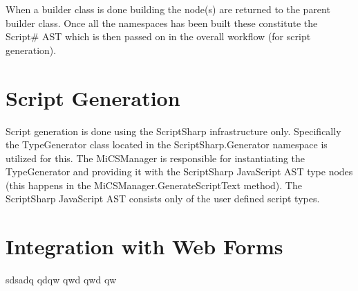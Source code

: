 	When a builder class is done building the node(s) are returned to the parent builder class. Once all the namespaces has been built these constitute the Script\# AST which is then passed on in the overall workflow (for script generation).

\section{Script Generation} %
\label{sec:script_generation}
	Script generation is done using the ScriptSharp infrastructure only. Specifically the TypeGenerator class located in the ScriptSharp.Generator namespace is utilized for this. The MiCSManager is responsible for instantiating the TypeGenerator and providing it with the ScriptSharp JavaScript AST type nodes (this happens in the MiCSManager.GenerateScriptText method). The ScriptSharp JavaScript AST consists only of the user defined script types.

\section{Integration with Web Forms} %
\label{sec:integration_with_web_forms}
	sdsadq qdqw qwd qwd qw 
